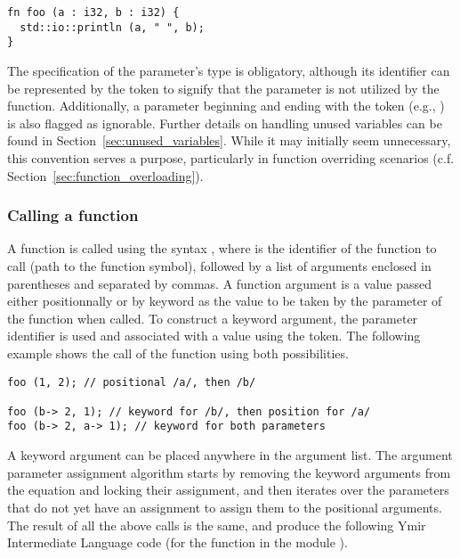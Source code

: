 \begin{lstlisting}[style=coloredverbatim]
fn foo (a : i32, b : i32) {
  std::io::println (a, " ", b);
}
\end{lstlisting}

The specification of the parameter's type is obligatory, although its identifier
can be represented by the token \token{\_} to signify that the parameter is not
utilized by the function. Additionally, a parameter beginning and ending with
the token \token{\_} (e.g., ) is also flagged as ignorable. Further
details on handling unused variables can be found in
Section~\ref{sec:unused_variables}. While it may initially seem unnecessary,
this convention serves a purpose, particularly in function overriding scenarios
(c.f. Section~\ref{sec:function_overloading}).

\subsubsection*{Calling a function}

A function is called using the syntax , where
 is the identifier of the function to call (path to the function
symbol), followed by a list of arguments enclosed in parentheses and separated
by commas. A function argument is a value passed either positionnally or by
keyword as the value to be taken by the parameter of the function when called.
To construct a keyword argument, the parameter identifier is used and associated
with a value using the \token{->} token. The following example shows the call
of the function  using both possibilities.

\begin{lstlisting}[style=coloredverbatim]
foo (1, 2); // positional /a/, then /b/

foo (b-> 2, 1); // keyword for /b/, then position for /a/
foo (b-> 2, a-> 1); // keyword for both parameters
\end{lstlisting}

A keyword argument can be placed anywhere in the argument list. The argument
parameter assignment algorithm starts by removing the keyword arguments from the
equation and locking their assignment, and then iterates over the parameters
that do not yet have an assignment to assign them to the positional arguments.
The result of all the above calls is the same, and produce the following Ymir
Intermediate Language code (for the function  in the module
).

